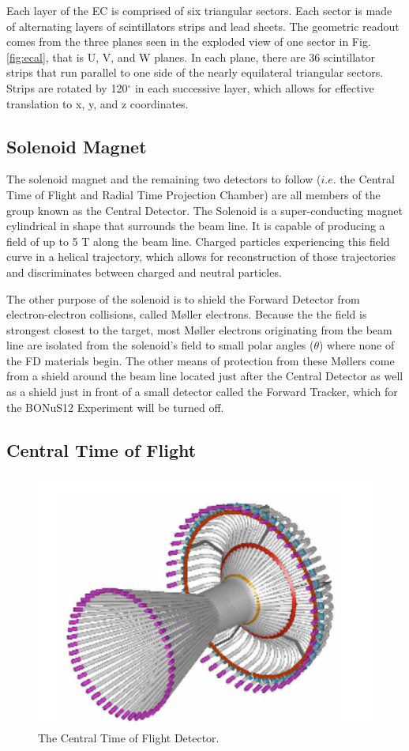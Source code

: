 Each layer of the EC is comprised of six triangular sectors. Each sector is made of alternating layers of scintillators strips and lead sheets. The geometric readout comes from the three planes seen in the exploded view of one sector in Fig. \ref{fig:ecal}, that is U, V, and W planes. In each plane, there are 36 scintillator strips that run parallel to one side of the nearly equilateral triangular sectors. Strips are rotated by 120$^{\circ}$ in each successive layer, which allows for effective translation to x, y, and z coordinates.  

\subsection{Solenoid Magnet}
The solenoid magnet and the remaining two detectors to follow ($i.e.$ the Central Time of Flight and Radial Time Projection Chamber) are all members of the group known as the Central Detector. The Solenoid is a super-conducting magnet cylindrical in shape that surrounds the beam line. It is capable of producing a field of up to 5 T along the beam line. Charged particles experiencing this field curve in a helical trajectory, which allows for reconstruction of those trajectories and discriminates between charged and neutral particles.

The other purpose of the solenoid is to shield the Forward Detector from electron-electron collisions, called M\o ller electrons. Because the the field is strongest closest to the target, most M\o ller electrons originating from the beam line are isolated from the solenoid's field to small polar angles ($\theta$) where none of the FD materials begin. The other means of protection from these M\o llers come from a shield around the beam line located just after the Central Detector as well as a shield just in front of a small detector called the Forward Tracker, which for the BONuS12 Experiment will be turned off.
 
\subsection{Central Time of Flight}
\begin{figure}
	\centering
	\includegraphics[width=0.9\linewidth]{figures/ctof.png}
	\caption{\label{fig:ctof}The Central Time of Flight Detector.}
\end{figure}

